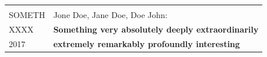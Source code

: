 \documentclass{article}
\begin{document}
\begin{adjustwidth}{-1.5cm}{-1.5cm}
\begin{vwcol}[widths={0.3,0.6},
sep=3.5cm, justify=top,rule=0pt,indent=0em]
\begin{minipage}[t]{0.7\textwidth}
\begin{tabular}{L{1.05\textwidth}}
\\
\end{tabular}
\begin{tabular}{C{.17\textwidth}|L{.85\textwidth}}
 \\
SOMETH&Jone Doe, Jane Doe, Doe John:\\   
XXXX&  \textbf{Something very absolutely deeply extraordinarily } \\
2017&  \textbf{extremely remarkably profoundly interesting} \\
 \end{tabular}
\end{minipage}
\end{vwcol}
 

\end{adjustwidth}
\end{document}
